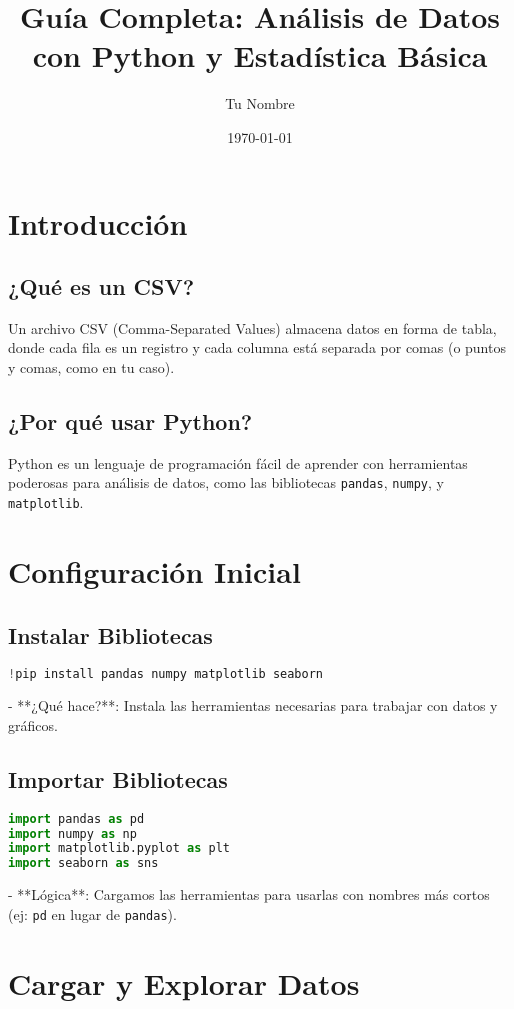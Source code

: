 \documentclass[12pt]{article}
\title{\textbf{Guía Completa: Análisis de Datos con Python y Estadística Básica}}
\author{Tu Nombre}
\date{\today}
\begin{document}
\maketitle

\tableofcontents

\section{Introducción}
\subsection{¿Qué es un CSV?}
Un archivo CSV (Comma-Separated Values) almacena datos en forma de tabla, donde cada fila es un registro y cada columna está separada por comas (o puntos y comas, como en tu caso).

\subsection{¿Por qué usar Python?}
Python es un lenguaje de programación fácil de aprender con herramientas poderosas para análisis de datos, como las bibliotecas \texttt{pandas}, \texttt{numpy}, y \texttt{matplotlib}.

\section{Configuración Inicial}
\subsection{Instalar Bibliotecas}
\begin{lstlisting}[language=Python]
!pip install pandas numpy matplotlib seaborn
\end{lstlisting}
- **¿Qué hace?**: Instala las herramientas necesarias para trabajar con datos y gráficos.

\subsection{Importar Bibliotecas}
\begin{lstlisting}[language=Python]
import pandas as pd
import numpy as np
import matplotlib.pyplot as plt
import seaborn as sns
\end{lstlisting}
- **Lógica**: Cargamos las herramientas para usarlas con nombres más cortos (ej: \texttt{pd} en lugar de \texttt{pandas}).

\section{Cargar y Explorar Datos}
\end{document}
